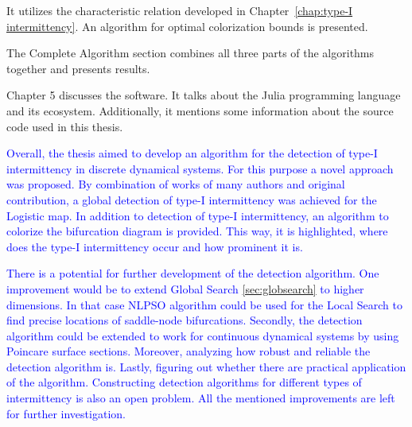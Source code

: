 It utilizes the characteristic relation developed in Chapter~\ref{chap:type-I intermittency}.
An algorithm for optimal colorization bounds is presented.
\par
The Complete Algorithm section combines all three parts of the algorithms together and presents results.
\par
Chapter 5 discusses the software.
It talks about the Julia programming language and its ecosystem.
Additionally, it mentions some information about the source code used in this thesis.
\par
\textcolor{blue}{
Overall, the thesis aimed to develop an algorithm for the detection of type-I intermittency in discrete dynamical systems.
For this purpose a novel approach was proposed.
By combination of works of many authors and original contribution, a global detection of type-I intermittency was achieved for the Logistic map.
In addition to detection of type-I intermittency, an algorithm to colorize the bifurcation diagram is provided.
This way, it is highlighted, where does the type-I intermittency occur and how prominent it is.
}
\par
\textcolor{blue}{
There is a potential for further development of the detection algorithm.
One improvement would be to extend Global Search \ref{sec:globsearch} to higher dimensions.
In that case NLPSO algorithm could be used for the Local Search to find precise locations of saddle-node bifurcations.
Secondly, the detection algorithm could be extended to work for continuous dynamical systems by using Poincare surface sections.
Moreover, analyzing how robust and reliable the detection algorithm is.
Lastly, figuring out whether there are practical application of the algorithm.
Constructing detection algorithms for different types of intermittency is also an open problem.
All the mentioned improvements are left for further investigation.
}

\endinput